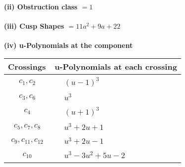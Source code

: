 \documentclass[1p]{elsarticle_modified}
\theoremstyle{definition}
\begin{document}
\flushleft \textbf{(ii) Obstruction class $= 1$}\\~\\
\flushleft \textbf{(iii) Cusp Shapes $= 11 a^2+9 a+22$}\\~\\
\newpage\renewcommand{\arraystretch}{1}
\flushleft \textbf{(iv) u-Polynomials at the component}\newline \\
\begin{tabular}{m{50pt}|m{274pt}}
Crossings & \hspace{64pt}u-Polynomials at each crossing \\
\hline $$\begin{aligned}c_{1},c_{2}\end{aligned}$$&$\begin{aligned}
&(u-1)^3
\end{aligned}$\\
\hline $$\begin{aligned}c_{3},c_{6}\end{aligned}$$&$\begin{aligned}
&u^3
\end{aligned}$\\
\hline $$\begin{aligned}c_{4}\end{aligned}$$&$\begin{aligned}
&(u+1)^3
\end{aligned}$\\
\hline $$\begin{aligned}c_{5},c_{7},c_{8}\end{aligned}$$&$\begin{aligned}
&u^3+2 u+1
\end{aligned}$\\
\hline $$\begin{aligned}c_{9},c_{11},c_{12}\end{aligned}$$&$\begin{aligned}
&u^3+2 u-1
\end{aligned}$\\
\hline $$\begin{aligned}c_{10}\end{aligned}$$&$\begin{aligned}
&u^3-3 u^2+5 u-2
\end{aligned}$\\
\hline
\end{tabular}\\~\\
\newpage\renewcommand{\arraystretch}{1}
\end{document}
